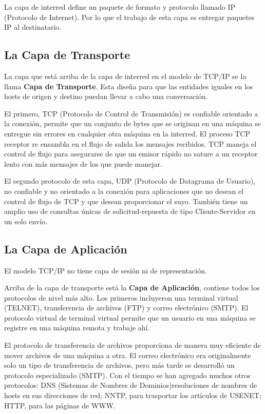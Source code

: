 \documentclass[12pt]{report}
\begin{document}
La capa de interred define un paquete de formato y protocolo llamado IP (Protocolo de Internet). Por lo que el trabajo de esta capa es entregar paquetes IP al destinatario.

\subsection*{La Capa de Transporte}

La capa que est\'a arriba de la capa de interred en el modelo de TCP/IP se la llama  {\bf Capa de Transporte}. Esta dise\~na para que las entidades iguales en los hosts de origen y destino puedan llevar a cabo una conversaci\'on.

El primero, TCP (Protocolo de Control de Transmisión) es confiable orientado a la conexi\'on, permite que un conjunto de bytes que se originan en una m\'aquina se entregue sin errores en cualquier otra m\'aquina en la interred. El proceso TCP receptor re ensambla en el flujo de salida los mensajes recibidos. TCP maneja el control de flujo para asegurarse de que un emisor r\'apido no sature a un receptor lento con m\'as mensajes de los que puede manejar. 


El segundo protocolo de esta capa, UDP (Protocolo de Datagrama de Usuario), no confiable y no orientado a la conexi\'on para aplicaciones que no desean el control de flujo de TCP y que desean proporcionar el suyo. 
Tambi\'en tiene un amplio uso de consultas \'unicas de solicitud-repuesta de tipo Cliente-Servidor en un solo env\'io. 

\subsection*{La Capa de Aplicaci\'on}  
 

El modelo TCP/IP no tiene capa de sesi\'on ni de representaci\'on.
 
Arriba de la capa de transporte est\'a la {\bf Capa de Aplicaci\'on}, contiene todos los protocolos de nivel m\'as alto. Los primeros incluyeron una terminal virtual (TELNET), transferencia de archivos (FTP) y correo electr\'onico (SMTP). El protocolo virtual de terminal virtual permite que un usuario en una m\'aquina se registre en una m\'aquina remota y trabaje ah\'i.
 
El protocolo de transferencia de archivos proporciona de manera muy eficiente de mover archivos de una m\'aquina a otra. El correo electr\'onico era originalmente solo un tipo de transferencia de archivos, pero m\'as tarde se desarroll\'o un protocolo especializado (SMTP). Con el tiempo se han agregado muchos otros protocolos: DNS (Sistemas de Nombres de Dominios)resoluciones de nombres de hosts en sus direcciones de red; NNTP, para trasportar los art\'iculos de USENET; HTTP, para las p\'aginas de WWW. 
\end{document}
